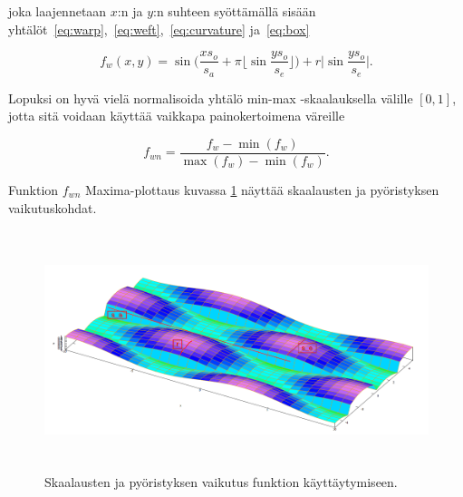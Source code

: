 \documentclass[utf8,bachelor]{gradu3}
\begin{document}
joka laajennetaan $x$:n ja $y$:n suhteen syöttämällä sisään yhtälöt~\eqref{eq:warp},~\eqref{eq:weft},~\eqref{eq:curvature} ja~\eqref{eq:box}

\begin{equation}
\label{eq:weave_xy}
f_w(x,y) = \sin{\big(\frac{xs_o}{s_a} + \pi \lfloor \sin{\frac{ys_o}{s_e}} \rfloor\big)} + r\lvert\sin{\frac{ys_o}{s_e}}\rvert.
\end{equation}

Lopuksi on hyvä vielä normalisoida yhtälö min-max -skaalauksella välille $\left[0,1\right]$, jotta sitä voidaan käyttää vaikkapa painokertoimena väreille

\begin{equation}
\label{eq:weave_norm}
f_{wn} = \frac{f_w-\min{(f_w)}}{\max{(f_w)}-\min{(f_w)}}.
\end{equation}

Funktion $f_{wn}$ Maxima-plottaus kuvassa \ref{fig:maxima_scale} näyttää skaalausten ja pyöristyksen vaikutuskohdat. 

\begin{figure}[h] 
	\centering
	\includegraphics[height=7cm]{weave_plot_scales_maxima_small.png}
	\caption{Skaalausten ja pyöristyksen vaikutus funktion käyttäytymiseen.}
	\label{fig:maxima_scale}
\end{figure}


\printbibliography 
\end{document}
